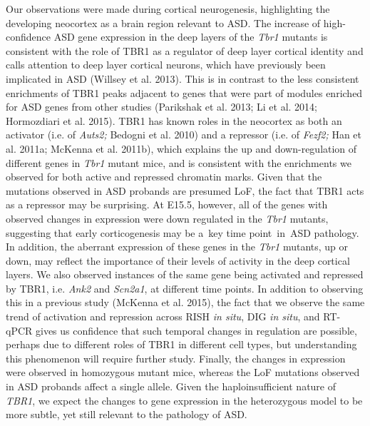 \documentclass[]{article}
\begin{document}
Our observations were made during cortical neurogenesis, highlighting
the developing neocortex as a brain region relevant to ASD. The increase
of high-confidence ASD gene expression in the deep layers of the
\emph{Tbr1} mutants is consistent with the role of TBR1 as a regulator
of deep layer cortical identity and calls attention to deep layer
cortical neurons, which have previously been implicated in ASD (Willsey
et al. 2013). This is in contrast to the less consistent enrichments of
TBR1 peaks adjacent to genes that were part of modules enriched for ASD
genes from other studies (Parikshak et al. 2013; Li et al. 2014;
Hormozdiari et al. 2015). TBR1 has known roles in the neocortex as both
an activator (i.e. of \emph{Auts2;} Bedogni et al. 2010) and a repressor
(i.e. of \emph{Fezf2;} Han et al. 2011a; McKenna et al. 2011b), which
explains the up and down-regulation of different genes in \emph{Tbr1}
mutant mice, and is consistent with the enrichments we observed for both
active and repressed chromatin marks. Given that the mutations observed
in ASD probands are presumed LoF, the fact that TBR1 acts as a repressor
may be surprising. At E15.5, however, all of the genes with observed
changes in expression were down regulated in the \emph{Tbr1} mutants,
suggesting that early corticogenesis may be a~key time point~in~ASD
pathology. In addition, the aberrant expression of these genes in the
\emph{Tbr1} mutants, up or down, may reflect the importance of their
levels of activity in the deep cortical layers. We also observed
instances of the same gene being activated and repressed by TBR1, i.e.
\emph{Ank2} and \emph{Scn2a1}, at different time points. In addition to
observing this in a previous study (McKenna et al. 2015), the fact that
we observe the same trend of activation and repression across RISH
\emph{in situ}, DIG \emph{in situ}, and RT-qPCR gives us confidence that
such temporal changes in regulation are possible, perhaps due to
different roles of TBR1 in different cell types, but understanding this
phenomenon will require further study. Finally, the changes in
expression were observed in homozygous mutant mice, whereas the LoF
mutations observed in ASD probands affect a single allele. Given the
haploinsufficient nature of \emph{TBR1}, we expect the changes to gene
expression in the heterozygous model to be more subtle, yet still
relevant to the pathology of ASD.
\end{document}

